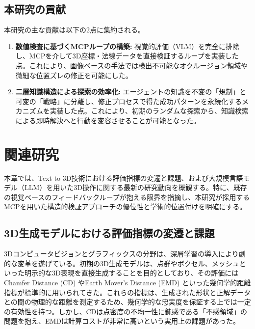 \documentclass[dvipdfmx, a4paper, 9pt]{deimj}
\begin{document}
\subsection{本研究の貢献}

本研究の主な貢献は以下の2点に集約される。
\begin{enumerate}
    \item \textbf{数値検査に基づくMCPループの構築:} 
    視覚的評価（VLM）を完全に排除し、MCPを介して3D座標・法線データを直接検証するループを実装した点。これにより、画像ベースの手法では検出不可能なオクルージョン領域や微細な位置ズレの修正を可能にした。
    \item \textbf{二層知識構造による探索の効率化:} 
    エージェントの知識を不変の「規制」と可変の「戦略」に分離し、修正プロセスで得た成功パターンを永続化するメカニズムを実装した点。これにより、初期のランダムな探索から、知識検索による即時解決へと行動を変容させることが可能となった。
\end{enumerate}

\section{関連研究}

本章では、Text-to-3D技術における評価指標の変遷と課題、および大規模言語モデル（LLM）を用いた3D操作に関する最新の研究動向を概観する。特に、既存の視覚ベースのフィードバックループが抱える限界を指摘し、本研究が採用するMCPを用いた構造的検証アプローチの優位性と学術的位置付けを明確にする。

\subsection{3D生成モデルにおける評価指標の変遷と課題}

3Dコンピュータビジョンとグラフィックスの分野は、深層学習の導入により劇的な変革を遂げている。初期の3D生成モデルは、点群やボクセル、メッシュといった明示的な3D表現を直接生成することを目的としており、その評価にはChamfer Distance (CD) やEarth Mover's Distance (EMD) といった幾何学的距離指標が標準的に用いられてきた\cite{fan2017point,nichol2022point}。これらの指標は、生成された形状と正解データとの間の物理的な距離を測定するため、幾何学的な忠実度を保証する上では一定の有効性を持つ。しかし、CDは点密度の不均一性に鈍感である「不感領域」の問題を抱え、EMDは計算コストが非常に高いという実用上の課題があった。
\end{document}
